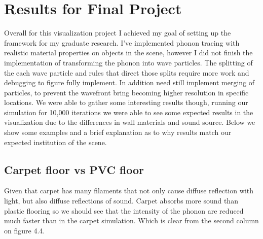 \documentclass{thesis}
\begin{document}
\chapter{Results for Final Project}

Overall for this visualization project I achieved my goal of setting up the framework for my graduate research. I’ve implemented phonon tracing with realistic material properties on objects in the scene, however I did not finish the implementation of transforming the phonon into wave particles. The splitting of the each wave particle and rules that direct those splits require more work and debugging to figure fully implement. In addition need still implement merging of particles, to prevent the wavefront bring becoming higher resolution in specific locations. We were able to gather some interesting results though, running our simulation for 
10,000
iterations we were able to see some expected results in the visualization due to the differences in wall materials and sound source. Below we show some examples and a brief explanation as to why results match our expected institution of the scene. 

\section{Carpet floor vs PVC floor}
Given that carpet has many filaments that not only cause diffuse reflection with light, but also diffuse reflections of sound. Carpet absorbs more sound than plastic flooring so we should see that the intensity of the phonon are reduced much faster than in the carpet simulation. Which is clear from the second column on figure 4.4.
\end{document}
